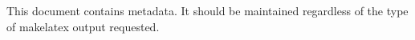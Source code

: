 \documentclass[letterpaper,12pt]{article}
\begin{document}
This document contains metadata. It should be maintained regardless of the type of makelatex output requested.
\end{document}
